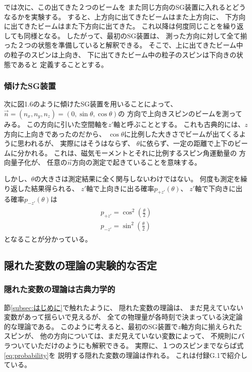 \documentclass[a4paper, 10pt]{jsarticle}
\begin{document}
では次に、この出てきた２つのビームを
また同じ方向のSG装置に入れるとどうなるかを実験する。
すると、上方向に出てきたビームはまた上方向に、
下方向に出てきたビームはまた下方向に出てきた。
これ以降は何度同じことを繰り返しても同様となる。
したがって、最初のSG装置は、
測った方向に対して全て揃った２つの状態を準備していると解釈できる。
そこで、上に出てきたビーム中の粒子のスピンは上向き、
下に出てきたビーム中の粒子のスピンは下向きの状態であると
定義することとする。

\subsubsection{傾けたSG装置}
次に図1.6のように傾けたSG装置を用いることによって、
$\vec{n} = (n_x, n_y, n_z) = (0, \sin \theta, \cos \theta)$の
方向で上向きスピンのビームを測ってみる。
この方向に引いた空間軸を$z'$軸と呼ぶこととする。
これも古典的には、$z$方向に上向きであったのだから、
$\cos \theta$に比例した大きさでビームが出てくるように思われるが、
実際にはそうはならず、
$\theta$に依らず、一定の距離で上下のビームに分かれる。
これは、磁気モーメントとそれに比例するスピン角運動量の
方向量子化が、
任意の$\vec{n}$方向の測定で起きていることを意味する。

しかし、$\theta$の大きさは測定結果に全く関与しないわけではない。
何度も測定を繰り返した結果得られる、
$z'$軸で上向きに出る確率$p_{+z'}(\theta)$、
$z'$軸で下向きに出る確率$p_{-z'}(\theta)$は
\begin{gather}
	\begin{gathered}
		p_{+z'} = \cos^2 \left( \frac{\theta}{2} \right) \\
		p_{-z'} = \sin^2 \left( \frac{\theta}{2} \right)
	\end{gathered}
	\label{eq:probability}
\end{gather}
となることが分かっている。

\subsection{隠れた変数の理論の実験的な否定}\label{subsec:実験否定}
\subsubsection{隠れた変数の理論は古典力学的}
節\ref{subsec:はじめに}で触れたように、
隠れた変数の理論は、
まだ見えていない変数があって揺らいで見えるが、
全ての物理量が各時刻で決まっている決定論的な理論である。
このように考えると、最初のSG装置で$z$軸方向に揃えられたスピンが、
他の方向については、まだ見えていない変数によって、
不規則にバラついていただけのようにも解釈できる。
実際に、１つのスピンまでならば式\eqref{eq:probability}を
説明する隠れた変数の理論は作れる。
これは付録G.1で紹介している。
\end{document}
